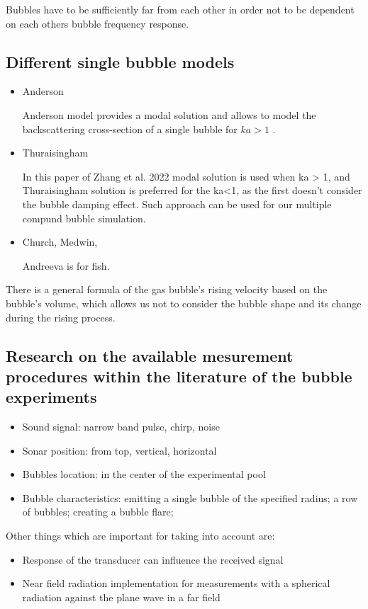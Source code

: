 Bubbles have to be sufficiently far from each other in order not to be dependent on each others bubble frequency response.

\subsection{Different single bubble models}
\begin{itemize}
    \item Anderson

    Anderson model provides a modal solution and allows to model the backscattering cross-section of a single bubble for $ka > 1$ \cite{anderson_sound_2005}.

    \item Thuraisingham

    In this paper of Zhang et al. 2022 \cite{zhang_efficient_2022} modal solution is used when ka > 1, and Thuraisingham solution is preferred for the ka<1, as the first doesn't consider the bubble damping effect.  Such approach can be used for our multiple compund bubble simulation.

    \item Church, Medwin,

    Andreeva is for fish.


\end{itemize}


There is a general formula of the gas bubble's rising velocity based on the bubble's volume, which allows us not to consider the bubble shape and its change during the rising process.



\subsection{Research on the available mesurement procedures within the literature of the bubble experiments}

\begin{itemize}
    \item  Sound signal: narrow band pulse, chirp, noise
    \item Sonar position: from top, vertical, horizontal
    \item Bubbles location: in the center of the experimental pool
   \item Bubble characteristics: emitting a single bubble of the specified radius; a row of bubbles; 
   creating a bubble flare;
\end{itemize}
Other things which are important for taking into account are:
\begin{itemize}
    \item Response of the transducer can influence the received signal
    \item Near field radiation implementation for measurements with a spherical radiation against the plane wave in a far field
\end{itemize}

